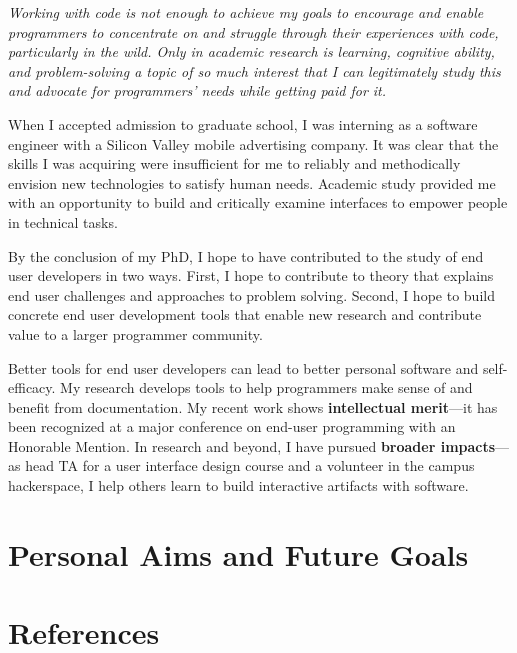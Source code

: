 \documentclass[12pt]{memoir}
\begin{document}

\emph{%
Working with code is not enough to achieve my goals to encourage and enable programmers to concentrate on and struggle through their experiences with code, particularly in the wild.
Only in academic research is learning, cognitive ability, and problem-solving a topic of so much interest that I can legitimately study this and advocate for programmers' needs while getting paid for it.
}

When I accepted admission to graduate school, I was interning as a software engineer with a Silicon Valley mobile advertising company.
It was clear that the skills I was acquiring were insufficient for me to reliably and methodically envision new technologies to satisfy human needs.
Academic study provided me with an opportunity to build and critically examine interfaces to empower people in technical tasks.

By the conclusion of my PhD, I hope to have contributed to the study of end user developers in two ways.
First, I hope to contribute to theory that explains end user challenges and approaches to problem solving.
Second, I hope to build concrete end user development tools that enable new research and contribute value to a larger programmer community.

Better tools for end user developers can lead to better personal software and self-efficacy.
My research develops tools to help programmers make sense of and benefit from documentation.
My recent work shows \textbf{intellectual merit}---it has been recognized at a major conference on end-user programming with an Honorable Mention.
In research and beyond, I have pursued \textbf{broader impacts}---as head TA for a user interface design course and a volunteer in the campus hackerspace, I help others learn to build interactive artifacts with software.
\fi

\section{Personal Aims and Future Goals}


\section{References}
\printbibliography[heading=none]
\end{document}
